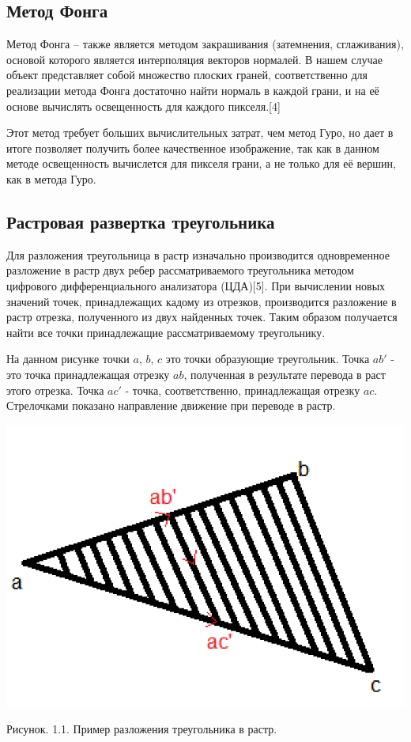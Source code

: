 \documentclass[12pt]{report}
\begin{document}
	\subsection{Метод Фонга}
	Метод Фонга – также является методом закрашивания (затемнения, сглаживания), основой которого является интерполяция векторов нормалей. В нашем случае объект представляет собой множество плоских граней, соответственно для реализации метода Фонга достаточно найти нормаль в каждой грани, и на её основе вычислять освещенность для каждого пикселя.[4]
	
	Этот метод требует больших вычислительных затрат, чем метод Гуро, но дает в итоге позволяет получить более качественное изображение, так как в данном методе освещенность вычислется для пикселя грани, а не только для её вершин, как в метода Гуро.
	
	\subsection{Растровая развертка треугольника}
	
	Для разложения треугольница в растр изначально производится одновременное разложение в растр двух ребер рассматриваемого треугольника методом цифрового дифференциального анализатора (ЦДА)[5]. При вычислении новых значений точек, принадлежащих кадому из отрезков, производится разложение в растр отрезка, полученного из двух найденных точек. Таким образом получается найти все точки принадлежащие рассматриваемому треугольнику.
	
	На данном рисунке точки $a$, $b$, $c$ это точки образующие треугольник. Точка $ab'$ - это точка принадлежащая отрезку $ab$, полученная в результате перевода в раст этого отрезка. Точка $ac'$ - точка, соответственно, принадлежащая отрезку $ac$. Стрелочками показано направление движение при переводе в растр.
	\begin{center}
		\includegraphics[scale=0.7]{cda.png}
		
		Рисунок. 1.1. Пример разложения треугольника в растр.
	\end{center}
	
\end{document}
